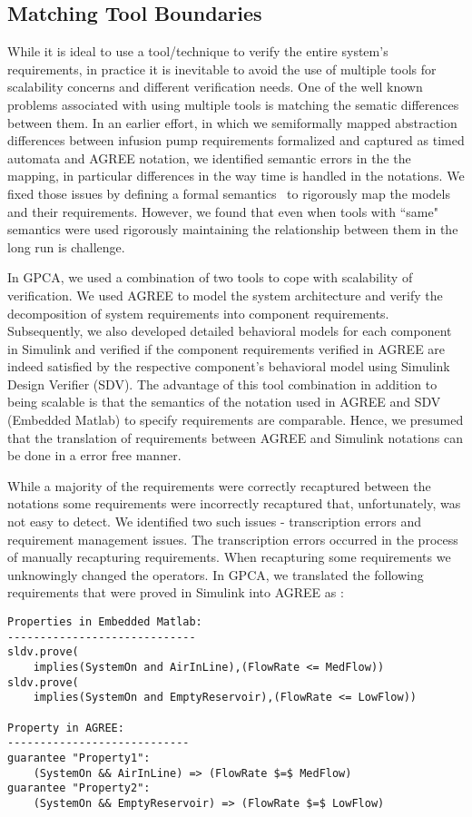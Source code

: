 \subsection{Matching Tool Boundaries}

While it is ideal to use a tool/technique to verify the entire system's requirements, in practice it is inevitable to avoid the use of multiple tools for scalability concerns and different verification needs. One of the well known problems associated with using multiple tools is matching the sematic differences between them. In an earlier effort, in which we semiformally mapped abstraction differences between infusion pump requirements formalized and captured as timed automata and AGREE notation, we identified semantic errors in the the mapping, in particular differences in the way time is handled in the notations. We fixed those issues by defining a formal semantics~\cite{whalen2015hierarchical} to rigorously map the models and their requirements. However, we found that even when tools with ``same" semantics were used rigorously maintaining the relationship between them in the long run is challenge.

In GPCA, we used a combination of two tools to cope with scalability of verification. We used AGREE to model the system architecture and verify the decomposition of system requirements into component requirements. Subsequently, we also developed detailed behavioral models for each component in Simulink and verified if the component requirements verified in AGREE are indeed satisfied by the respective component's behavioral model using Simulink Design Verifier (SDV). The advantage of this tool combination in addition to being scalable is that the semantics of the notation used in AGREE and SDV (Embedded Matlab) to specify requirements are comparable. Hence, we presumed that the translation of requirements between AGREE and Simulink notations can be done in a error free manner.

While a majority of the requirements were correctly recaptured between the notations some requirements were incorrectly recaptured that, unfortunately, was not easy to detect. We identified two such issues - transcription errors and requirement management issues. The transcription errors occurred in the process of manually recapturing requirements. When recapturing some requirements we unknowingly changed the operators. In GPCA, we translated the following requirements that were proved in Simulink into AGREE as :

\scriptsize{
\begin{verbatim}
Properties in Embedded Matlab:
-----------------------------
sldv.prove(
    implies(SystemOn and AirInLine),(FlowRate <= MedFlow))
sldv.prove(
    implies(SystemOn and EmptyReservoir),(FlowRate <= LowFlow))
    
Property in AGREE:
----------------------------
guarantee "Property1": 
    (SystemOn && AirInLine) => (FlowRate $=$ MedFlow)
guarantee "Property2":
    (SystemOn && EmptyReservoir) => (FlowRate $=$ LowFlow)    
\end{verbatim}
}
\normalsize{}

